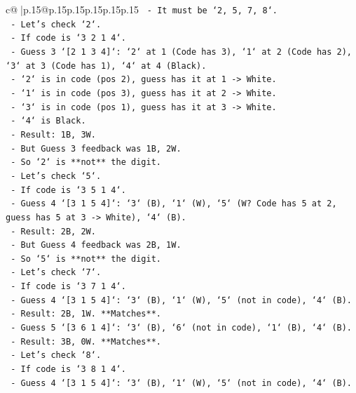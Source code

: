 \documentclass{article}
\begin{document}
{\begin{supertabular}{c@{$\;$}|p{.15\linewidth}@{}p{.15\linewidth}p{.15\linewidth}p{.15\linewidth}p{.15\linewidth}p{.15\linewidth}}
{{{\texttt{    {-} It must be `2, 5, 7, 8`.} \\
\texttt{    {-} Let's check `2`.} \\
\texttt{        {-} If code is `3 2 1 4`.} \\
\texttt{        {-} Guess 3 `{[}2 1 3 4{]}`: `2` at 1 (Code has 3), `1` at 2 (Code has 2), `3` at 3 (Code has 1), `4` at 4 (Black).} \\
\texttt{        {-} `2` is in code (pos 2), guess has it at 1 {-}> White.} \\
\texttt{        {-} `1` is in code (pos 3), guess has it at 2 {-}> White.} \\
\texttt{        {-} `3` is in code (pos 1), guess has it at 3 {-}> White.} \\
\texttt{        {-} `4` is Black.} \\
\texttt{        {-} Result: 1B, 3W.} \\
\texttt{        {-} But Guess 3 feedback was 1B, 2W.} \\
\texttt{        {-} So `2` is **not** the digit.} \\
\texttt{    {-} Let's check `5`.} \\
\texttt{        {-} If code is `3 5 1 4`.} \\
\texttt{        {-} Guess 4 `{[}3 1 5 4{]}`: `3` (B), `1` (W), `5` (W? Code has 5 at 2, guess has 5 at 3 {-}> White), `4` (B).} \\
\texttt{        {-} Result: 2B, 2W.} \\
\texttt{        {-} But Guess 4 feedback was 2B, 1W.} \\
\texttt{        {-} So `5` is **not** the digit.} \\
\texttt{    {-} Let's check `7`.} \\
\texttt{        {-} If code is `3 7 1 4`.} \\
\texttt{        {-} Guess 4 `{[}3 1 5 4{]}`: `3` (B), `1` (W), `5` (not in code), `4` (B).} \\
\texttt{        {-} Result: 2B, 1W. **Matches**.} \\
\texttt{        {-} Guess 5 `{[}3 6 1 4{]}`: `3` (B), `6` (not in code), `1` (B), `4` (B).} \\
\texttt{        {-} Result: 3B, 0W. **Matches**.} \\
\texttt{    {-} Let's check `8`.} \\
\texttt{        {-} If code is `3 8 1 4`.} \\
\texttt{        {-} Guess 4 `{[}3 1 5 4{]}`: `3` (B), `1` (W), `5` (not in code), `4` (B).} \\
}}}
\end{supertabular}}
\end{document}
